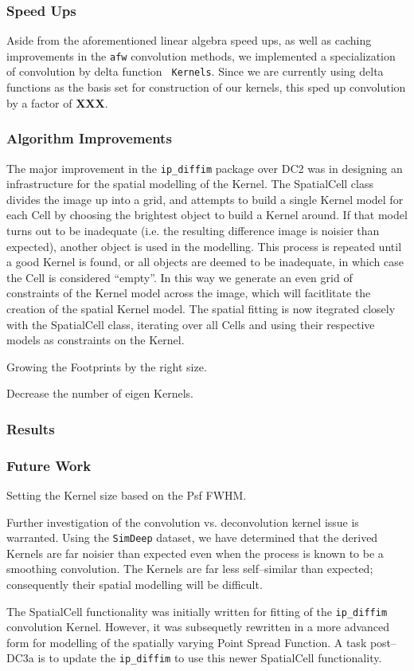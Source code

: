 \subsubsection{Speed Ups}

Aside from the aforementioned linear algebra speed ups, as well as
caching improvements in the {\tt afw} convolution methods, we
implemented a specialization of convolution by delta function {\tt
Kernels}.  Since we are currently using delta functions as the basis
set for construction of our kernels, this sped up convolution by a
factor of {\bf XXX}.

\subsubsection{Algorithm Improvements}

The major improvement in the {\tt ip\_diffim} package over DC2 was in
designing an infrastructure for the spatial modelling of the Kernel.
The SpatialCell class divides the image up into a grid, and attempts
to build a single Kernel model for each Cell by choosing the brightest
object to build a Kernel around.  If that model turns out to be
inadequate (i.e. the resulting difference image is noisier than
expected), another object is used in the modelling.  This process is
repeated until a good Kernel is found, or all objects are deemed to be
inadequate, in which case the Cell is considered ``empty''.  In this
way we generate an even grid of constraints of the Kernel model across
the image, which will facitlitate the creation of the spatial Kernel
model.  The spatial fitting is now itegrated closely with the
SpatialCell class, iterating over all Cells and using their respective
models as constraints on the Kernel.


Growing the Footprints by the right size.

Decrease the number of eigen Kernels.

\subsubsection{Results}

\subsubsection{Future Work}

Setting the Kernel size based on the Psf FWHM.

Further investigation of the convolution vs. deconvolution kernel
issue is warranted.  Using the {\tt SimDeep} dataset, we have
determined that the derived Kernels are far noisier than expected even
when the process is known to be a smoothing convolution.  The Kernels
are far less self--similar than expected; consequently their spatial
modelling will be difficult.

The SpatialCell functionality was initially written for fitting of the
{\tt ip\_diffim} convolution Kernel.  However, it was subsequetly
rewritten in a more advanced form for modelling of the spatially
varying Point Spread Function.  A task post--DC3a is to update the
{\tt ip\_diffim} to use this newer SpatialCell functionality.
